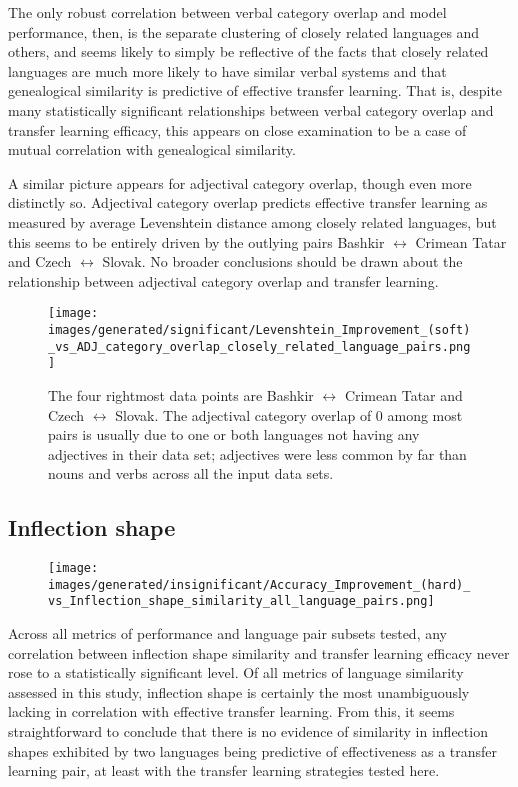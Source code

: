 The only robust correlation between verbal category overlap and model performance, then, is the separate clustering of closely related languages and others, and seems likely to simply be reflective of the facts that closely related languages are much more likely to have similar verbal systems and that genealogical similarity is predictive of effective transfer learning. That is, despite many statistically significant relationships between verbal category overlap and transfer learning efficacy, this appears on close examination to be a case of mutual correlation with genealogical similarity.

A similar picture appears for adjectival category overlap, though even more distinctly so. Adjectival category overlap predicts effective transfer learning as measured by average Levenshtein distance among closely related languages, but this seems to be entirely driven by the outlying pairs Bashkir $\leftrightarrow$ Crimean Tatar and Czech $\leftrightarrow$ Slovak. No broader conclusions should be drawn about the relationship between adjectival category overlap and transfer learning.

\begin{figure}[ht]
\texttt{[image: images/generated/significant/Levenshtein\_Improvement\_(soft)\_vs\_ADJ\_category\_overlap\_closely\_related\_language\_pairs.png]}
\centering
\caption{The four rightmost data points are Bashkir $\leftrightarrow$ Crimean Tatar and Czech $\leftrightarrow$ Slovak. The adjectival category overlap of 0 among most pairs is usually due to one or both languages not having any adjectives in their data set; adjectives were less common by far than nouns and verbs across all the input data sets.}
\end{figure}

\subsection{Inflection shape}

\begin{figure}[ht]
\texttt{[image: images/generated/insignificant/Accuracy\_Improvement\_(hard)\_vs\_Inflection\_shape\_similarity\_all\_language\_pairs.png]}
\centering
\caption{}
\end{figure}

Across all metrics of performance and language pair subsets tested, any correlation between inflection shape similarity and transfer learning efficacy never rose to a statistically significant level. Of all metrics of language similarity assessed in this study, inflection shape is certainly the most unambiguously lacking in correlation with effective transfer learning. From this, it seems straightforward to conclude that there is no evidence of similarity in inflection shapes exhibited by two languages being predictive of effectiveness as a transfer learning pair, at least with the transfer learning strategies tested here.

